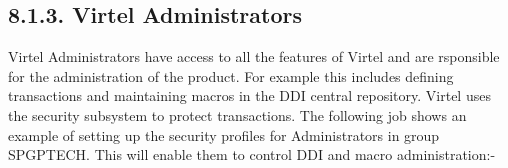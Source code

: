 \documentclass[letterpaper,10pt,english]{sphinxmanual}
\begin{document}


\subsection{8.1.3. Virtel Administrators}
\label{\detokenize{Installation_Guide:virtel-administrators}}
Virtel Administrators have access to all the features of Virtel and are rsponsible for the administration of the product. For example this includes defining transactions and maintaining macros in the DDI central repository. Virtel uses the security subsystem to protect transactions. The following job shows an example of setting up the security profiles for Administrators in group SPGPTECH. This will enable them to control DDI and macro administration:-
\end{document}
